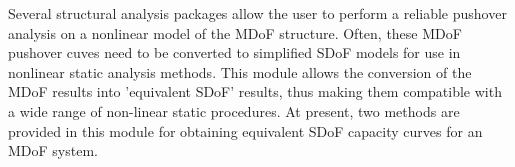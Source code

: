Several structural analysis packages allow the user to perform a reliable pushover analysis on a nonlinear model of the MDoF structure. Often, these MDoF pushover cuves need to be converted to simplified SDoF models for use in nonlinear static analysis methods. This module allows the conversion of the MDoF results into 'equivalent SDoF' results, thus making them compatible with a wide range of non-linear static procedures. At present, two methods are provided in this module for obtaining equivalent SDoF capacity curves for an MDoF system.